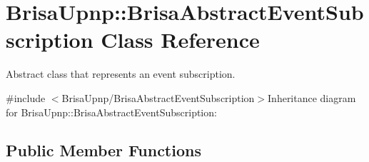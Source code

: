 \hypertarget{classBrisaUpnp_1_1BrisaAbstractEventSubscription}{
\section{BrisaUpnp::BrisaAbstractEventSubscription Class Reference}
\label{classBrisaUpnp_1_1BrisaAbstractEventSubscription}
}


Abstract class that represents an event subscription.  


{\ttfamily \#include $<$BrisaUpnp/BrisaAbstractEventSubscription$>$}Inheritance diagram for BrisaUpnp::BrisaAbstractEventSubscription:\subsection*{Public Member Functions}

